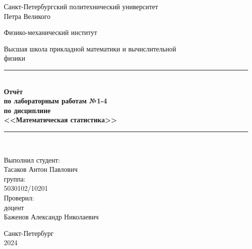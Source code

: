 \begin{titlepage}

\begin{center}
    Санкт-Петербургский политехнический университет \\Петра Великого
\end{center}

\begin{center}
    Физико-механический институт
\end{center}

\begin{center}
    Высшая школа прикладной математики и вычислительной\\ физики
\end{center}

\vspace{8em}

\begin{center}
\rule{\textwidth}{1pt} 
\\
\textbf{Отчёт\\
по лабораторным работам №1-4\\
по дисциплине\\
<<Математическая статистика>>}
\rule{\textwidth}{1pt} 
\\
\end{center}

\vspace{8em}


\begin{flushright}
\begin{minipage}{.45\textwidth}
Выполнил студент:\\
Тасаков Антон Павлович\\
группа:\\
5030102/10201\\
Проверил:\\
доцент\\
Баженов Александр Николаевич
\end{minipage}
\end{flushright}

\vspace{8em}
\begin{center}
    Санкт-Петербург\\
    2024
\end{center}

\end{titlepage}